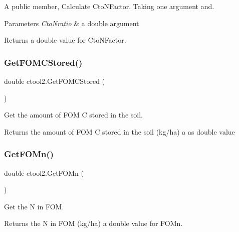 A public member, Calculate Cto\+N\+Factor. Taking one argument and. 


\begin{DoxyParams}{Parameters}
{\em Cto\+Nratio} & a double argument \\
\hline
\end{DoxyParams}
\begin{DoxyReturn}{Returns}
a double value for Cto\+N\+Factor. 
\end{DoxyReturn}
\mbox{\label{classctool2_a64472639343da0e7e753a2b5f169468e}} 
\subsubsection{\texorpdfstring{GetFOMCStored()}{GetFOMCStored()}}
{\footnotesize\ttfamily double ctool2.\+Get\+F\+O\+M\+C\+Stored (\begin{DoxyParamCaption}{ }\end{DoxyParamCaption})\hspace{0.3cm}{\ttfamily [inline]}}



Get the amount of F\+OM C stored in the soil. 

\begin{DoxyReturn}{Returns}
the amount of F\+OM C stored in the soil (kg/ha) a as double value 
\end{DoxyReturn}
\mbox{\label{classctool2_a2b677a56b7667baa7811fef3646d6086}} 
\subsubsection{\texorpdfstring{GetFOMn()}{GetFOMn()}}
{\footnotesize\ttfamily double ctool2.\+Get\+F\+O\+Mn (\begin{DoxyParamCaption}{ }\end{DoxyParamCaption})\hspace{0.3cm}{\ttfamily [inline]}}



Get the N in F\+OM. 

\begin{DoxyReturn}{Returns}
the N in F\+OM (kg/ha) a double value for F\+O\+Mn. 
\end{DoxyReturn}
\mbox{\label{classctool2_af39503c35e1348a77007bb8d52afb436}} 
